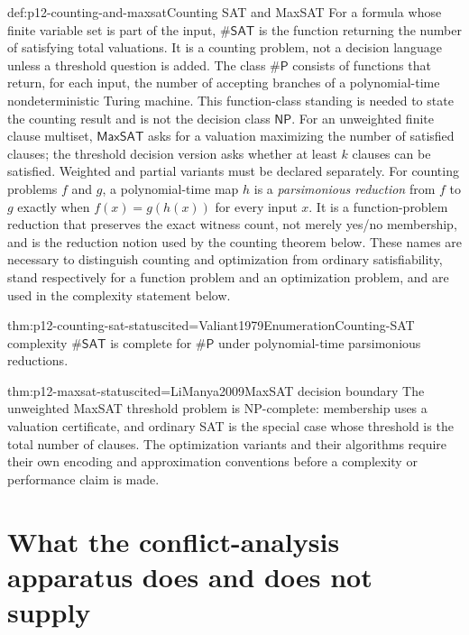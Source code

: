 \begin{hbdefinition}{def:p12-counting-and-maxsat}{Counting SAT and MaxSAT}
For a formula whose finite variable set is part of the input,
\(\#\mathsf{SAT}\) is the function returning the number of satisfying total
valuations.  It is a counting problem, not a decision language unless a
threshold question is added.  The class \(\#\mathsf P\) consists of functions
that return, for each input, the number of accepting branches of a
polynomial-time nondeterministic Turing machine.  This function-class standing
is needed to state the counting result and is not the decision class
\(\mathsf{NP}\).  For an unweighted finite clause multiset,
\(\mathsf{MaxSAT}\) asks for a valuation maximizing the number of satisfied
clauses; the threshold decision version asks whether at least \(k\) clauses
can be satisfied.  Weighted and partial variants must be declared separately.
For counting problems \(f\) and \(g\), a polynomial-time map \(h\) is a
\emph{parsimonious reduction} from \(f\) to \(g\) exactly when
\(f(x)=g(h(x))\) for every input \(x\).  It is a function-problem reduction
that preserves the exact witness count, not merely yes/no membership, and is
the reduction notion used by the counting theorem below.
These names are necessary to distinguish counting and optimization from
ordinary satisfiability, stand respectively for a function problem and an
optimization problem, and are used in the complexity statement below.
\end{hbdefinition}

\begin{hbtheorem}{thm:p12-counting-sat-status}{cited=Valiant1979Enumeration}{Counting-SAT complexity}
\(\#\mathsf{SAT}\) is complete for \(\#\mathsf P\) under polynomial-time
parsimonious reductions.
\end{hbtheorem}

\begin{hbtheorem}{thm:p12-maxsat-status}{cited=LiManya2009}{MaxSAT decision boundary}
The unweighted MaxSAT threshold problem is NP-complete:
membership uses a valuation certificate, and ordinary SAT is the special case
whose threshold is the total number of clauses.  The optimization variants
and their algorithms require their own encoding and approximation conventions
before a complexity or performance claim is made.
\end{hbtheorem}

\section{What the conflict-analysis apparatus does and does not supply}

